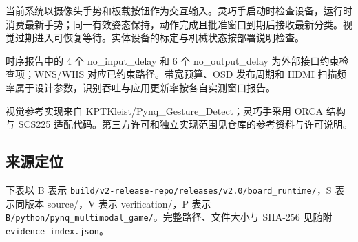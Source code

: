 当前系统以摄像头手势和板载按钮作为交互输入。灵巧手启动时检查设备，运行时消费最新手势；同一有效姿态保持，动作完成且批准窗口到期后接收最新分类。视觉过期进入可恢复等待。实体设备的标定与机械状态按部署说明检查。

时序报告中的 4 个 no\_input\_delay 和 6 个 no\_output\_delay 为外部接口约束检查项；WNS/WHS 对应已约束路径。带宽预算、OSD 发布周期和 HDMI 扫描频率属于设计参数，识别吞吐与应用更新率按各自实测窗口报告。

视觉参考实现来自 KPTKleist/Pynq\_Gesture\_Detect；灵巧手采用 ORCA 结构与 SCS225 适配代码。第三方许可和独立实现范围见仓库的参考资料与许可说明。

\subsection{来源定位}
下表以 B 表示 \nolinkurl{build/v2-release-repo/releases/v2.0/board_runtime/}，S 表示同版本 source/，V 表示 verification/，P 表示 \nolinkurl{B/python/pynq_multimodal_game/}。完整路径、文件大小与 SHA-256 见随附 \nolinkurl{evidence_index.json}。

